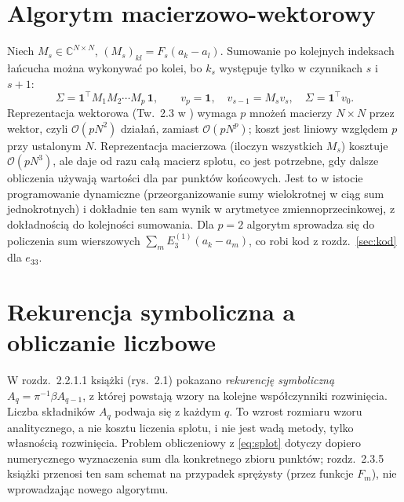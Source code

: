 \documentclass[12pt,a4paper,twoside,openright]{report}
\theoremstyle{definition}
\theoremstyle{remark}
\begin{document}
{\section{Algorytm macierzowo-wektorowy}
Niech $M_s\in\mathbb C^{N\times N}$, $(M_s)_{kl}=F_s(a_k-a_l)$. Sumowanie po kolejnych indeksach łańcucha można wykonywać po kolei, bo $k_{s}$ występuje tylko w czynnikach $s$ i $s+1$:
\begin{equation}\label{eq:wektor}
\Sigma=\mathbf 1^{\!\top}M_1M_2\cdots M_p\,\mathbf 1,\qquad v_p=\mathbf 1,\quad v_{s-1}=M_s v_s,\quad \Sigma=\mathbf 1^{\!\top}v_0 .
\end{equation}
Reprezentacja wektorowa (Tw.~2.3 w \cite{drygas2019applied}) wymaga $p$ mnożeń macierzy $N\times N$ przez wektor, czyli $\mathcal O(pN^2)$ działań, zamiast $\mathcal O(pN^p)$; koszt jest liniowy względem $p$ przy ustalonym $N$. Reprezentacja macierzowa (iloczyn wszystkich $M_s$) kosztuje $\mathcal O(pN^3)$, ale daje od razu całą macierz splotu, co jest potrzebne, gdy dalsze obliczenia używają wartości dla par punktów końcowych. Jest to w istocie programowanie dynamiczne (przeorganizowanie sumy wielokrotnej w ciąg sum jednokrotnych) i dokładnie ten sam wynik w arytmetyce zmiennoprzecinkowej, z dokładnością do kolejności sumowania. Dla $p=2$ algorytm sprowadza się do policzenia sum wierszowych $\sum_m E_3^{(1)}(a_k-a_m)$, co robi kod z rozdz.~\ref{sec:kod} dla $e_{33}$.

\section{Rekurencja symboliczna a obliczanie liczbowe}
W rozdz.~2.2.1.1 książki (rys.~2.1) pokazano \emph{rekurencję symboliczną} $A_q=\pi^{-1}\beta A_{q-1}$, z której powstają wzory na kolejne współczynniki rozwinięcia. Liczba składników $A_q$ podwaja się z każdym $q$. To wzrost rozmiaru wzoru analitycznego, a nie kosztu liczenia splotu, i nie jest wadą metody, tylko własnością rozwinięcia. Problem obliczeniowy z \eqref{eq:splot} dotyczy dopiero numerycznego wyznaczenia sum dla konkretnego zbioru punktów; rozdz.~2.3.5 książki przenosi ten sam schemat na przypadek sprężysty (przez funkcje $F_m$), nie wprowadzając nowego algorytmu.

}
\end{document}
